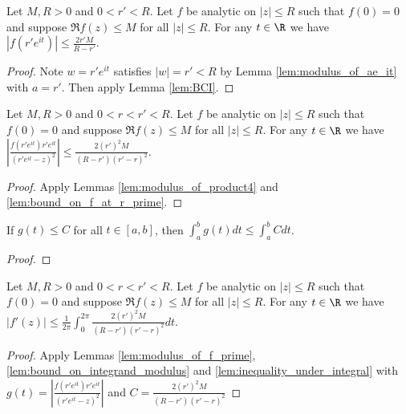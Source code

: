 
\begin{lemma}\label{lem:bound_on_f_at_r_prime} \leanok
Let $M,R>0$ and $0<r'<R$. Let $f$ be analytic on $|z| \le R$ such that $f(0)=0$ and suppose $\Re f(z) \le M$ for all $|z| \le R$. For any $t \in \R$ we have $|f(r'e^{it})| \le \frac{2r' M}{R-r'}$.
\end{lemma}
\begin{proof}
\leanok
{}
Note $w=r'e^{it}$ satisfies $|w|=r'<R$ by Lemma \ref{lem:modulus_of_ae_it} with $a=r'$. Then apply Lemma \ref{lem:BCI}.
\end{proof}



\begin{lemma}\label{lem:bound_on_integrand_modulus} \leanok
Let $M,R>0$ and $0<r<r'<R$. Let $f$ be analytic on $|z| \le R$ such that $f(0)=0$ and suppose $\Re f(z) \le M$ for all $|z| \le R$. For any $t \in \R$ we have $\left|\frac{f(r'e^{it}) r'e^{it}}{(r'e^{it}-z)^2}\right| \le \frac{2(r')^2M}{(R-r')(r'-r)^2}$.
\end{lemma}
\begin{proof}\leanok
{}
Apply Lemmas \ref{lem:modulus_of_product4} and \ref{lem:bound_on_f_at_r_prime}.
\end{proof}


\begin{lemma}\label{lem:inequality_under_integral} \leanok
If $g(t) \le C$ for all $t \in [a,b]$, then $\int_a^b g(t) dt \le \int_a^b C dt$.
\end{lemma}
\begin{proof}
\leanok
\end{proof}


\begin{lemma}\label{lem:f_prime_bound_by_integral_of_constant} \leanok
Let $M,R>0$ and $0<r<r'<R$. Let $f$ be analytic on $|z| \le R$ such that $f(0)=0$ and suppose $\Re f(z) \le M$ for all $|z| \le R$. For any $t \in \R$ we have
$|f'(z)| \le \frac{1}{2\pi} \int_{0}^{2\pi} \frac{2(r')^2M}{(R-r')(r'-r)^2} dt$.
\end{lemma}
\begin{proof}\leanok
{}
Apply Lemmas \ref{lem:modulus_of_f_prime}, \ref{lem:bound_on_integrand_modulus} and \ref{lem:inequality_under_integral} with $g(t)=\left|\frac{f(r'e^{it}) r'e^{it}}{(r'e^{it}-z)^2}\right|$ and $C=\frac{2(r')^2M}{(R-r')(r'-r)^2}$
\end{proof}


